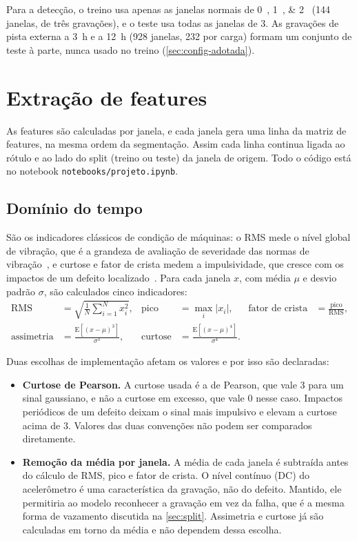 Para a detecção, o treino usa apenas as janelas normais de
\SIlist{0;1;2}{\hp} (144 janelas, de três gravações), e o teste usa todas as
janelas de \SI{3}{\hp}. As gravações de pista externa a 3~h e a 12~h
(\num{928} janelas, 232 por carga) formam um conjunto de teste à parte, nunca
usado no treino (\autoref{sec:config-adotada}).

\section{Extração de features}
\label{sec:features}

As features são calculadas por janela, e cada janela gera uma linha da matriz
de features, na mesma ordem da segmentação. Assim cada linha continua ligada ao
rótulo e ao lado do split (treino ou teste) da janela de origem. Todo o código
está no notebook \texttt{notebooks/projeto.ipynb}.

\subsection{Domínio do tempo}
\label{sec:features-tempo}

São os indicadores clássicos de condição de máquinas: o RMS mede o nível global de
vibração, que é a grandeza de avaliação de severidade das normas de
vibração~\cite{randall2011livro}, e curtose e fator de crista medem a impulsividade, que
cresce com os impactos de um defeito localizado~\cite{randall2011livro}. Para cada
janela $x$, com média $\mu$ e desvio padrão $\sigma$, são calculados cinco
indicadores:
\begin{align}
  \text{RMS} &= \sqrt{\tfrac{1}{N}\textstyle\sum_{i=1}^{N} x_i^2}, &
  \text{pico} &= \max_i |x_i|, &
  \text{fator de crista} &= \frac{\text{pico}}{\text{RMS}}, \\
  \text{assimetria} &= \frac{\mathrm{E}[(x-\mu)^3]}{\sigma^3}, &
  \text{curtose} &= \frac{\mathrm{E}[(x-\mu)^4]}{\sigma^4}. & &
\end{align}

Duas escolhas de implementação afetam os valores e por isso são declaradas:
\begin{itemize}
  \item \textbf{Curtose de Pearson.} A curtose usada é a de Pearson, que vale 3
  para um sinal gaussiano, e não a curtose em excesso, que vale 0 nesse caso.
  Impactos periódicos de um defeito deixam o sinal mais impulsivo e elevam a
  curtose acima de 3. Valores das duas convenções não podem ser comparados
  diretamente.
  \item \textbf{Remoção da média por janela.} A média de cada janela é
  subtraída antes do cálculo de RMS, pico e fator de crista. O nível contínuo
  (DC) do acelerômetro é uma característica da gravação, não do defeito. Mantido,
  ele permitiria ao modelo reconhecer a gravação em vez da falha, que é a mesma
  forma de vazamento discutida na \autoref{sec:split}. Assimetria e curtose já
  são calculadas em torno da média e não dependem dessa escolha.
\end{itemize}

